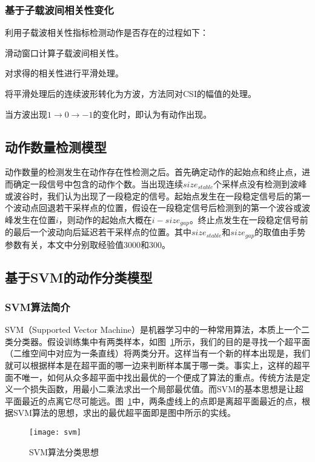 \subsubsection{基于子载波间相关性变化}
利用子载波相关性指标检测动作是否存在的过程如下：
\begin{compactenum}
\item 滑动窗口计算子载波间相关性。
\item 对求得的相关性进行平滑处理。
\item 将平滑处理后的连续波形转化为方波，方法同对CSI的幅值的处理。
\item 当方波出现$1 \to 0 \to - 1$的变化时，即认为有动作出现。
\end{compactenum}

\subsection{动作数量检测模型}
动作数量的检测发生在动作存在性检测之后。首先确定动作的起始点和终止点，进而确定一段信号中包含的动作个数。当出现连续$size_{stable}$个采样点没有检测到波峰或波谷时，我们认为出现了一段稳定的信号。起始点发生在一段稳定信号后的第一个波动点回退若干采样点的位置，假设在一段稳定信号后检测到的第一个波谷或波峰发生在位置$i$，则动作的起始点大概在$i - size_{gap}$。终止点发生在一段稳定信号前的最后一个波动向后延迟若干采样点的位置。其中$size_{stable}$和$size_{gap}$的取值由手势参数有关，本文中分别取经验值3000和300。


\subsection{基于SVM的动作分类模型}
            
\subsubsection{SVM算法简介}

SVM（Supported Vector Machine）是机器学习中的一种常用算法，本质上一个二类分类器。假设训练集中有两类样本，如图~\ref{fig:svm}所示，我们的目的是寻找一个超平面（二维空间中对应为一条直线）将两类分开。这样当有一个新的样本出现是，我们就可以根据样本是在超平面的哪一边来判断样本属于哪一类。事实上，这样的超平面不唯一，如何从众多超平面中找出最优的一个便成了算法的重点。传统方法是定义一个损失函数，用最小二乘法求出一个局部最优值。而SVM的基本思想是让超平面最近的点离它尽可能远。图~\ref{fig:svm}中，两条虚线上的点即是离超平面最近的点，根据SVM算法的思想，求出的最优超平面即是图中所示的实线。

\begin{figure}[htbp] %
  \centering
  \texttt{[image: svm]}
  \caption{SVM算法分类思想}
  \label{fig:svm}
\end{figure}

